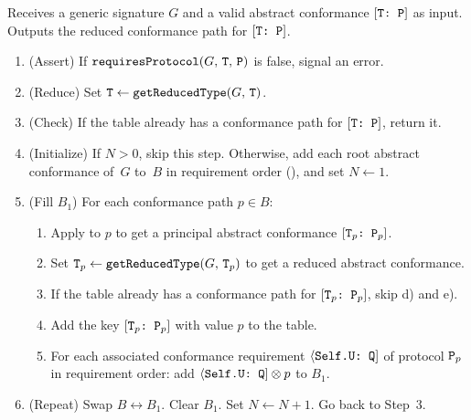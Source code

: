 \documentclass[../generics]{subfiles}
\begin{document}
\begin{algorithm}\label{find conformance path algorithm}
Receives a generic signature $G$ and a valid abstract conformance $[\texttt{T:~P}]$ as input. Outputs the reduced conformance path for $[\texttt{T:~P}]$.

\begin{enumerate}
\item (Assert) If $\texttt{requiresProtocol}(G,\,\texttt{T},\,\texttt{P})$ is false, signal an error.

\item (Reduce) Set $\texttt{T}\leftarrow\texttt{getReducedType}(G,\,\texttt{T})$.

\item (Check) If the table already has a conformance path for $[\texttt{T:~P}]$, return it.

\item (Initialize) If $N>0$, skip this step. Otherwise, add each root abstract conformance of~$G$ to~$B$ in requirement order (), and set $N\leftarrow 1$.

\item (Fill $B_1$) For each conformance path $p\in B$:

\begin{enumerate}

\item Apply  to $p$ to get a principal abstract conformance $[\texttt{$\texttt{T}_p$:~$\texttt{P}_p$}]$.

\item Set $\texttt{T}_p\leftarrow\texttt{getReducedType}(G,\,\texttt{T}_p)$ to get a reduced abstract conformance.

\item If the table already has a conformance path for $[\texttt{$\texttt{T}_p$:~$\texttt{P}_p$}]$, skip d) and e).

\item Add the key $[\texttt{$\texttt{T}_p$:~$\texttt{P}_p$}]$ with value $p$ to the table.

\item For each associated conformance requirement $\langle\texttt{Self.U:~Q}]$ of protocol $\texttt{P}_p$ in requirement order: add $\langle\texttt{Self.U:~Q}]\otimes p$ to $B_1$.
\end{enumerate}

\item (Repeat) Swap $B \leftrightarrow B_1$. Clear $B_1$. Set $N\leftarrow N+1$. Go back to Step~3.
\end{enumerate}
\end{algorithm}
\end{document}
